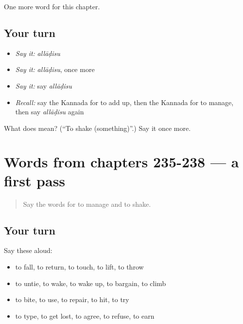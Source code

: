 \begin{grammarlens}[title={What you've built}]
One more word for this chapter.
\end{grammarlens}

\subsection*{Your turn}
\begin{itemize}
\raggedright
  \item \emph{Say it:} \emph{allāḍisu}
  \item \emph{Say it:} \emph{allāḍisu}, once more
  \item \emph{Say it:} say \emph{allāḍisu}
  \item \emph{Recall:} say the Kannada for to add up, then the Kannada for to manage, then say \emph{allāḍisu} again
\end{itemize}

\begin{tcolorbox}[breakable,colback=teal!4,colframe=teal!35!black,title={Before you move on}]
What does  mean? (\textquotedblleft{}To shake (something)\textquotedblright{}.) Say it once more.
\end{tcolorbox}
\section[(dialogue)]{Words from chapters 235-238 — a first pass}

\label{lesson:KA-R243-first-pass-words-from-chapters-235-238}



\begin{quote}
Say the words for to manage and to shake.
\end{quote}

\subsection*{Your turn}
Say these aloud:

\begin{itemize}
\raggedright
  \item to fall, to return, to touch, to lift, to throw
  \item to untie, to wake, to wake up, to bargain, to climb
  \item to bite, to use, to repair, to hit, to try
  \item to type, to get lost, to agree, to refuse, to earn
\end{itemize}

